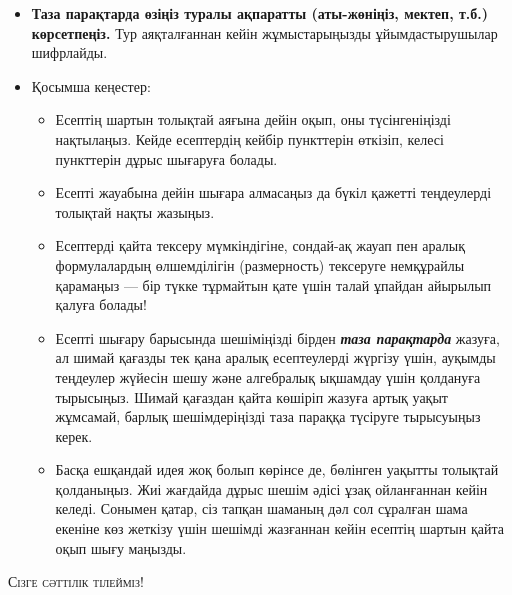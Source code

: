 \begin{itemize}[leftmargin=*]
    \item \textbf{Таза парақтарда өзіңіз туралы ақпаратты (аты-жөніңіз, мектеп, т.б.) көрсетпеңіз.} Тур аяқталғаннан кейін жұмыстарыңызды ұйымдастырушылар шифрлайды.
    \item Қосымша кеңестер:
    \begin{itemize}[label=$\circ$]
        \item Есептің шартын толықтай аяғына дейін оқып, оны түсінгеніңізді нақтылаңыз. Кейде есептердің кейбір пункттерін өткізіп, келесі пункттерін дұрыс шығаруға болады.
        \item Есепті жауабына дейін шығара алмасаңыз да бүкіл қажетті теңдеулерді толықтай нақты жазыңыз.
        \item Есептерді қайта тексеру мүмкіндігіне, сондай-ақ жауап пен аралық формулалардың өлшемділігін (размерность) тексеруге немқұрайлы қарамаңыз --- бір түкке тұрмайтын қате үшін талай ұпайдан айырылып қалуға болады!
        \item Есепті шығару барысында шешіміңізді бірден \textbf{\textit{таза парақтарда}} жазуға, ал шимай қағазды тек қана аралық есептеулерді жүргізу үшін, ауқымды теңдеулер жүйесін шешу және алгебралық ықшамдау үшін қолдануға тырысыңыз. Шимай қағаздан қайта көшіріп жазуға артық уақыт жұмсамай, барлық шешімдеріңізді таза параққа түсіруге тырысуыңыз керек.
        \item Басқа ешқандай идея жоқ болып көрінсе де, бөлінген уақытты толықтай қолданыңыз. Жиі жағдайда дұрыс шешім әдісі ұзақ ойланғаннан кейін келеді. Сонымен қатар, сіз тапқан шаманың дәл сол сұралған шама екеніне көз жеткізу үшін шешімді жазғаннан кейін есептің шартын қайта оқып шығу маңызды.
    \end{itemize}
\end{itemize}
\vspace{4pt}
\begin{center}
    \textsc{Сізге сәттілік тілейміз!}
\end{center}
%
\begin{center}
    \textit{}
\end{center}

\newpage